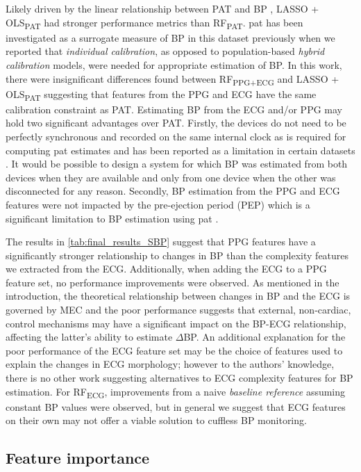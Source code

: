 \documentclass[fleqn,10pt]{wlscirep}
\begin{document}
Likely driven by the linear relationship between PAT and BP \cite{Finnegan2021}, LASSO + OLS\textsubscript{PAT} had stronger performance metrics than RF\textsubscript{PAT}. \ac{pat} has been investigated as a surrogate measure of BP in this dataset previously \cite{Finnegan2021} when we reported that \textit{individual calibration}, as opposed to population-based \textit{hybrid calibration} models, were needed for appropriate estimation of BP. In this work, there were insignificant differences found between RF\textsubscript{PPG+ECG} and LASSO + OLS\textsubscript{PAT} suggesting that features from the PPG and ECG have the same calibration constraint as PAT. Estimating BP from the ECG and/or PPG may hold two significant advantages over PAT. Firstly, the devices do not need to be perfectly synchronous and recorded on the same internal clock as is required for computing \ac{pat} estimates and has been reported as a limitation in certain datasets \cite{Bennis2019}. It would be possible to design a system for which BP was estimated from both devices when they are available and only from one device when the other was disconnected for any reason. Secondly, BP estimation from the PPG and ECG features were not impacted by the pre-ejection period (PEP) which is a significant limitation to BP estimation using \ac{pat} \cite{Payne2006}.

The results in \cref{tab:final_results_SBP} suggest that PPG features have a significantly stronger relationship to changes in BP than the complexity features we extracted from the ECG. Additionally, when adding the ECG to a PPG feature set, no performance improvements were observed. As mentioned in the introduction, the theoretical relationship between changes in BP and the ECG is governed by MEC and the poor performance suggests that external, non-cardiac, control mechanisms may have a significant impact on the BP-ECG relationship, affecting the latter's ability to estimate $\Delta$BP. An additional explanation for the poor performance of the ECG feature set may be the choice of features used to explain the changes in ECG morphology; however to the authors' knowledge, there is no other work suggesting alternatives to ECG complexity features for BP estimation. For RF\textsubscript{ECG}, improvements from a naive \textit{baseline reference} assuming constant BP values were observed, but in general we suggest that ECG features on their own may not offer a viable solution to cuffless BP monitoring.


\subsection{Feature importance}
\end{document}
